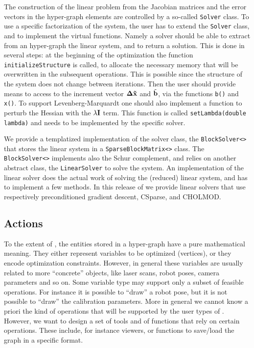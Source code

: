 \documentclass[a4paper]{article}
\begin{document}
The construction of the linear problem from the Jacobian matrices and the error vectors
in the hyper-graph elements are controlled by a so-called \verb+Solver+ class.
To use a specific factorization of the system, the user has to extend the
\verb+Solver+ class, and to implement the virtual functions.
Namely a solver should be able to extract from an
hyper-graph the linear system, and to return a solution.  This is
done in several steps: at the beginning of the optimization the
function \verb+initializeStructure+ is called, to allocate the
necessary memory that will be overwritten in the subsequent
operations. This is possible since the structure of the system does
not change between iterations. Then the user should provide means to
access to the increment vector $\mathbf{\Delta \tilde x}$ and $\tilde {\mathbf{b}}$, via the
functions \verb+b()+ and \verb+x()+. To support Levenberg-Marquardt
one should also implement a function to perturb the Hessian with the
$\lambda \mathbf{I}$ term. This function is called
\verb+setLambda(double lambda)+ and needs to be implemented by the
specific solver.

We provide a templatized implementation of the solver class, the
\verb+BlockSolver<>+ that stores the linear system in a
\verb+SparseBlockMatrix<>+ class. The \verb+BlockSolver<>+ implements
also the Schur complement, and relies on another abstract class, the
\verb+LinearSolver+ to solve the system.
An implementation of the linear solver does the actual work
of solving the (reduced) linear system, and has to implement a few methods.
In this release of \gopt{} we provide linear solvers that use respectively
preconditioned gradient descent, CSparse, and CHOLMOD.


\subsection{Actions}
To the extent of \gopt{}, the entities stored in a hyper-graph have a
pure mathematical meaning. They either represent variables to be
optimized (vertices), or they encode optimization constraints.
However, in general these variables are usually related to more
``concrete'' objects, like laser scans, robot poses, camera parameters
and so on.  Some variable type may support only a subset of feasible
operations.  For instance it is possible to ``draw'' a robot pose, but
it is not possible to ``draw'' the calibration parameters.  More in
general we cannot know a priori the kind of operations that will be
supported by the user types of \gopt.  However, we want to design a set
of tools and of functions that rely on certain operations. These include,
for instance viewers, or functions to save/load the graph in a specific format.
\end{document}
